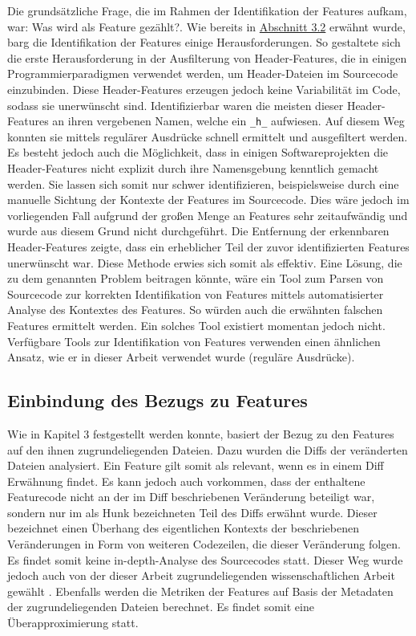 Die grundsätzliche Frage, die im Rahmen der Identifikation der Features aufkam, war: \glqq Was wird als Feature gezählt?\grqq. Wie bereits in \hyperref[construction]{Abschnitt 3.2} erwähnt wurde, barg die Identifikation der Features einige Herausforderungen. So gestaltete sich die erste Herausforderung in der Ausfilterung von \glqq Header-Features\grqq{}, die in einigen Programmierparadigmen verwendet werden, um Header-Dateien im Sourcecode einzubinden. Diese Header-Features erzeugen jedoch keine Variabilität im Code, sodass sie unerwünscht sind. Identifizierbar waren die meisten dieser Header-Features an ihren vergebenen Namen, welche ein \texttt{\_h\_} aufwiesen. Auf diesem Weg konnten sie mittels regulärer Ausdrücke schnell ermittelt und ausgefiltert werden. Es besteht jedoch auch die Möglichkeit, dass in einigen Softwareprojekten die Header-Features nicht explizit durch ihre Namensgebung kenntlich gemacht werden. Sie lassen sich somit nur schwer identifizieren, beispielsweise durch eine manuelle Sichtung der Kontexte der Features im Sourcecode. Dies wäre jedoch im vorliegenden Fall aufgrund der großen Menge an Features sehr zeitaufwändig und wurde aus diesem Grund nicht durchgeführt. Die Entfernung der erkennbaren Header-Features zeigte, dass ein erheblicher Teil der zuvor identifizierten Features unerwünscht war. Diese Methode erwies sich somit als effektiv.
Eine Lösung, die zu dem genannten Problem beitragen könnte, wäre ein Tool zum Parsen von Sourcecode zur korrekten Identifikation von Features mittels automatisierter Analyse des Kontextes des Features. So würden auch die erwähnten \glqq falschen\grqq{} Features ermittelt werden. Ein solches Tool existiert momentan jedoch nicht. Verfügbare Tools zur Identifikation von Features verwenden einen ähnlichen Ansatz, wie er in dieser Arbeit verwendet wurde (reguläre Ausdrücke).

\subsection*{Einbindung des Bezugs zu Features}
Wie in Kapitel 3 festgestellt werden konnte, basiert der Bezug zu den Features auf den ihnen zugrundeliegenden Dateien. Dazu wurden die Diffs der veränderten Dateien analysiert. Ein Feature gilt somit als relevant, wenn es in einem Diff Erwähnung findet. Es kann jedoch auch vorkommen, dass der enthaltene Featurecode nicht an der im Diff beschriebenen Veränderung beteiligt war, sondern nur im als \glqq Hunk\grqq{} bezeichneten Teil des Diffs erwähnt wurde. Dieser bezeichnet einen Überhang des eigentlichen Kontexts der beschriebenen Veränderungen in Form von weiteren Codezeilen, die dieser Veränderung folgen. Es findet somit keine \glqq in-depth\grqq -Analyse des Sourcecodes statt. Dieser Weg wurde jedoch auch von der dieser Arbeit zugrundeliegenden wissenschaftlichen Arbeit gewählt \cite{Queiroz2016}. Ebenfalls werden die Metriken der Features auf Basis der Metadaten der zugrundeliegenden Dateien berechnet. Es findet somit eine Überapproximierung statt.

